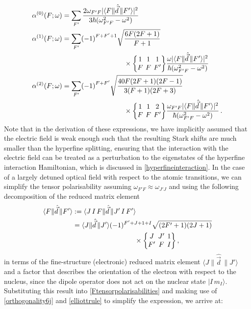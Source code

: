 \documentclass[../Thesis-IJspeert.tex]{subfiles}
\begin{document}
\begin{align}
\label{Ftensorpolarisabilities}
\begin{split}
 \alpha^{(0)}\left(F;\omega\right) &= \sum_{F'} \frac{2\omega_{F'F} \lvert \langle{F}\| \hat{\vec{d}}\, \|{F'}\rangle\rvert^2}{3\hbar\left(\omega_{F'F}^2-\omega^2\right)} \\ \alpha^{(1)}\left(F;\omega\right) &= \sum_{F'}  \left(-1\right)^{F+F'+1}\sqrt{\frac{6F\left(2F+1\right)}{F+1}}  \\ &\hspace{9em}\times\tj{1}{1}{1}{F}{F}{F'} \frac{\omega \lvert \langle{F}\|  \hat{\vec{d}}\,  \|{F'}\rangle\rvert^2}{\hbar\left(\omega_{F'F}^2-\omega^2\right)} \\ \alpha^{(2)}\left(F;\omega\right) &= \sum_{F'}  \left(-1\right)^{F+F'}\sqrt{\frac{40F\left(2F+1\right)\left(2F-1\right)}{3\left(F+1\right)\left(2F+3\right)}} \\ &\hspace{9em}\times \tj{1}{1}{2}{F}{F}{F'}  \frac{\omega_{F'F} \lvert \langle{F}\|  \hat{\vec{d}}\,  \|{F'}\rangle\rvert^2}{\hbar\left(\omega_{F'F}^2-\omega^2\right)}  \,.
\end{split}    
\end{align}
Note that in the derivation of these expressions, we have implicitly assumed that the electric field is weak enough such that the resulting Stark shifts are much smaller than the hyperfine splitting, ensuring that the interaction with the electric field can be treated as a perturbation to the eigenstates of the hyperfine interaction Hamiltonian, which is discussed in \autoref{hyperfineinteraction}. In the case of a largely detuned optical field with respect to the atomic transitions, we can simplify the tensor polarisability assuming $\omega_{F'F}\approx\omega_{J'J}$ and using the following decomposition of the reduced matrix element
\begin{align}
\begin{split}
	 \langle F\| \hat{\vec{d}}\, \| F'\rangle &:= \langle J\, I\, F\| \hat{\vec{d}}\, \| J'\, I\, F'\rangle \\
	&=\langle J\| \hat{\vec{d}}\, \| J'\rangle(-1)^{F'+J+1+I} \sqrt{\left(2 F'+1\right)(2 J+1)} \\ &\hspace{9em}\times \tj{J}{J'}{1}{F'}{F}{I}\,,
\end{split}  
\end{align}
in terms of the fine-structure (electronic) reduced matrix element $\langle J\| \hat{\vec{d}}\, \| J'\rangle$ and a factor that describes the orientation of the electron with respect to the nucleus, since the dipole operator does not act on the nuclear state $\vert I\, m_I \rangle$. Substituting this result into \autoref{Ftensorpolarisabilities} and making use of \autoref{orthogonality6j} and \autoref{elliottrule} to simplify the expression, we arrive at:
\end{document}
